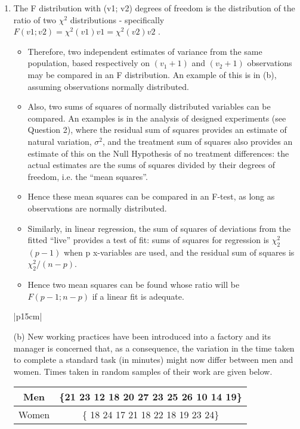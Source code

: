 \documentclass[a4paper,12pt]{article}
\begin{document}
\begin{enumerate}
\item The F distribution with (v1; v2) degrees of freedom is the distribution of the
ratio of two $\chi^2$ distributions - specifically $F(v1; v2) = \chi^2(v1)
v1
=
\chi^2(v2)
v2$
. 
\begin{itemize}
\item Therefore,
two independent estimates of variance from the same population, based respectively
on $(v_1 + 1)$ and $(v_2 + 1)$ observations may be compared in an F
distribution. An example of this is in (b), assuming observations normally
distributed.
\item Also, two sums of squares of normally distributed variables can be compared.
An examples is in the analysis of designed experiments (see Question
2), where the residual sum of squares provides an estimate of natural variation,
$\sigma^2$, and the treatment sum of squares also provides an estimate of
this on the Null Hypothesis of no treatment differences: the actual estimates
are the sums of squares divided by their degrees of freedom, i.e. the “mean
squares”.
\item Hence these mean squares can be compared in an F-test, as long
as observations are normally distributed.
\item Similarly, in linear regression, the sum of squares of deviations from the fitted
“live” provides a test of fit: sums of squares for regression is $\chi^2_2$
$(p-1)$ when
p x-variables are used, and the residual sum of squares is $\chi^2_2/(n-p)$. 
\item Hence two
mean squares can be found whose ratio will be $F(p - 1; n - p)$ if a linear fit
is adequate.
\end{itemize}
\newpage
\begin{table}[ht!]
     
\centering
     
\begin{tabular}{|p{15cm}|}
     
\hline 
(b) New working practices have been introduced into a factory and its manager is
concerned that, as a consequence, the variation in the time taken to complete a standard
task (in minutes) might now differ between men and women. Times taken in random
samples of their work are given below.
\begin{center}
\begin{tabular}{|c|c|}
Men & \{21 23 12 18 20 27 23 25 26 10 14 19\} \\ \hline
Women & \{ 18 24 17 21 18 22 18 19 23 24\}\\
\end{tabular}
 

\end{center}
\end{tabular}
\end{table}
\end{enumerate}
\end{document}
